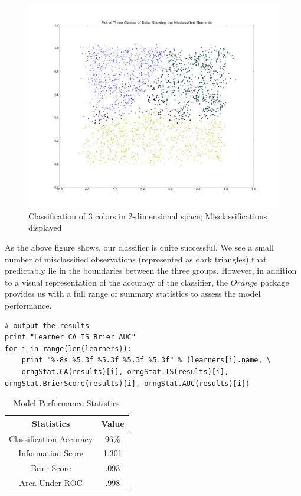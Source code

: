 \begin{figure}[H]
    \centering
       \includegraphics[width=6.5 in]{3_groups_mis.png}
    \caption{Classification of 3 colors in 2-dimensional space; Misclassifications displayed}
    \label{Example Data}
\end{figure}

\begin{flushleft}As the above figure shows, our classifier is quite successful. We see a small number of misclassified observations (represented as dark triangles) that predictably lie in the boundaries between the three groups. However, in addition to a visual representation of the accuracy of the classifier, the $Orange$ package provides us with a full range of summary statistics to assess the model performance. 
\end{flushleft}
\begin{lstlisting}[caption={Compute the Misclassified Observations},label=2nd,firstnumber=151]
# output the results
print "Learner CA IS Brier AUC"
for i in range(len(learners)):
    print "%-8s %5.3f %5.3f %5.3f %5.3f" % (learners[i].name, \
    orngStat.CA(results)[i], orngStat.IS(results)[i], orngStat.BrierScore(results)[i], orngStat.AUC(results)[i])
\end{lstlisting}

\begin{table}[H]
\caption{Model Performance Statistics}
\centering
\begin{tabular}{c c}
\hline\hline
Statistics & Value\\
\hline
Classification Accuracy & 96\% \\
Information Score & 1.301\\
Brier Score & .093\\
Area Under ROC &.998\\
\hline
\end{tabular}
\label{table:nonlin} 
\end{table}

